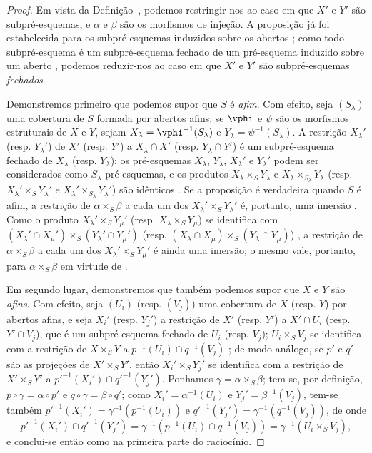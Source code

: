 \documentclass[oneside]{amsart}
\newcommand{\oldpage}[2][]{{\marginnote{\normalfont\textbf{#1}~|~#2}}\ignorespaces}
\begin{document}
\begin{proof}
Em vista da Definição~, podemos restringir-nos ao caso em que $X'$ e $Y'$ são subpré-esquemas, e $\alpha$ e $\beta$ são os morfismos de injeção.
A proposição já foi estabelecida para os subpré-esquemas induzidos sobre os abertos ;
como todo subpré-esquema é um subpré-esquema fechado de um pré-esquema induzido sobre um aberto , podemos reduzir-nos ao caso em que $X'$ e $Y'$ são subpré-esquemas \emph{fechados}.

Demonstremos primeiro que podemos supor que $S$ é \emph{afim}.
Com efeito, seja $(S_\lambda)$ uma cobertura de $S$ formada por abertos afins;
se $\vphi$ e $\psi$ são os morfismos estruturais de $X$ e $Y$, sejam $X_\lambda=\vphi^{-1}(S_\lambda)$ e $Y_\lambda=\psi^{-1}(S_\lambda)$.
A restrição $X_\lambda'$ (resp. $Y_\lambda'$) de $X'$ (resp. $Y'$) a $X_\lambda\cap X'$ (resp. $Y_\lambda\cap Y'$) é um subpré-esquema fechado de $X_\lambda$ (resp. $Y_\lambda$); os pré-esquemas $X_\lambda$, $Y_\lambda$, $X_\lambda'$ e $Y_\lambda'$ podem ser considerados como $S_\lambda$-pré-esquemas, e os produtos $X_\lambda\times_S Y_\lambda$ e $X_\lambda\times_{S_\lambda}Y_\lambda$ (resp. $X_\lambda'\times_S Y_\lambda'$ e $X_\lambda'\times_{S_\lambda}Y_\lambda'$) são idênticos .
Se a proposição é verdadeira quando $S$ é afim, a restrição de $\alpha\times_S\beta$ a cada um dos $X_\lambda'\times_S Y_\lambda'$ é, portanto, uma imersão .
Como o produto $X_\lambda'\times_S Y_\mu'$ (resp. $X_\lambda\times_S Y_\mu$) se identifica com $(X_\lambda'\cap X_\mu')\times_S(Y_\lambda'\cap Y_\mu')$ (resp. $(X_\lambda\cap X_\mu)\times_S(Y_\lambda\cap Y_\mu)$) , a restrição de $\alpha\times_S\beta$
\oldpage[I]{125}
a cada um dos $X_\lambda'\times_S Y_\mu'$ é ainda uma imersão;
o mesmo vale, portanto, para $\alpha\times_S\beta$ em virtude de .

Em segundo lugar, demonstremos que também podemos supor que $X$ e $Y$ são \emph{afins}.
Com efeito, seja $(U_i)$ (resp. $(V_j)$) uma cobertura de $X$ (resp. $Y$) por abertos afins, e seja $X_i'$ (resp. $Y_j'$) a restrição de $X'$ (resp. $Y'$) a $X'\cap U_i$ (resp. $Y'\cap V_j$), que é um subpré-esquema fechado de $U_i$ (resp. $V_j$);
$U_i\times_S V_j$ se identifica com a restrição de $X\times_S Y$ a $p^{-1}(U_i)\cap q^{-1}(V_j)$ ;
de modo análogo, se $p'$ e $q'$ são as projeções de $X'\times_S Y'$, então $X_i'\times_S Y_j'$ se identifica com a restrição de $X'\times_S Y'$ a ${p'}^{-1}(X_i')\cap{q'}^{-1}(Y_j')$.
Ponhamos $\gamma=\alpha\times_S\beta$;
tem-se, por definição, $p\circ\gamma=\alpha\circ p'$ e $q\circ\gamma=\beta\circ q'$;
como $X_i'=\alpha^{-1}(U_i)$ e $Y_j'=\beta^{-1}(V_j)$, tem-se também ${p'}^{-1}(X_i')=\gamma^{-1}(p^{-1}(U_i))$ e ${q'}^{-1}(Y_j')=\gamma^{-1}(q^{-1}(V_j))$, de onde
\[
  {p'}^{-1}(X_i')\cap{q'}^{-1}(Y_j')=\gamma^{-1}(p^{-1}(U_i)\cap q^{-1}(V_j))=\gamma^{-1}(U_i\times_S V_j),
\]
e conclui-se então como na primeira parte do raciocínio.


\end{proof}
\end{document}

